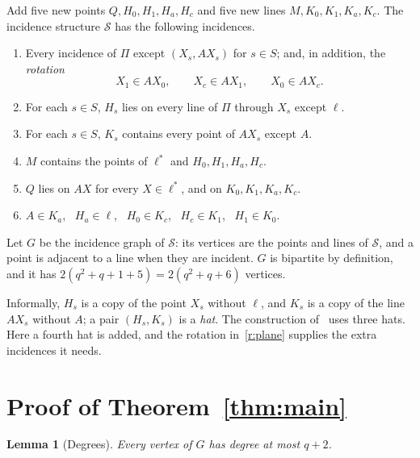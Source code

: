 \documentclass[11pt]{amsart}
\newtheorem{lemma}[theorem]{Lemma}
\theoremstyle{remark}
\newcommand{\cS}{\mathcal{S}}
\begin{document}
Add five new points $Q, H_0, H_1, H_a, H_c$ and five new lines $M, K_0, K_1, K_a, K_c$. The incidence structure $\cS$ has the following incidences.
\begin{enumerate}[label=\textup{(R\arabic*)},leftmargin=3em]
\item\label{r:plane} Every incidence of $\Pi$ except $(X_s, AX_s)$ for $s \in S$; and, in addition, the \emph{rotation}
\[ X_1 \in AX_0, \qquad X_c \in AX_1, \qquad X_0 \in AX_c. \]
\item\label{r:hat} For each $s \in S$, $H_s$ lies on every line of $\Pi$ through $X_s$ except $\ell$.
\item\label{r:hatline} For each $s \in S$, $K_s$ contains every point of $AX_s$ except $A$.
\item\label{r:M} $M$ contains the points of $\ell^*$ and $H_0, H_1, H_a, H_c$.
\item\label{r:Q} $Q$ lies on $AX$ for every $X \in \ell^*$, and on $K_0, K_1, K_a, K_c$.
\item\label{r:links} $A \in K_a$, \ $H_a \in \ell$, \ $H_0 \in K_c$, \ $H_c \in K_1$, \ $H_1 \in K_0$.
\end{enumerate}
Let $G$ be the incidence graph of $\cS$: its vertices are the points and lines of $\cS$, and a point is adjacent to a line when they are incident. $G$ is bipartite by definition, and it has $2(q^2+q+1+5) = 2(q^2+q+6)$ vertices.

Informally, $H_s$ is a copy of the point $X_s$ without $\ell$, and $K_s$ is a copy of the line $AX_s$ without $A$; a pair $(H_s, K_s)$ is a \emph{hat}. The construction of~\cite{AL} uses three hats. Here a fourth hat is added, and the rotation in~\ref{r:plane} supplies the extra incidences it needs.

\section{Proof of Theorem~\ref{thm:main}}

\begin{lemma}[Degrees]\label{lem:deg}
Every vertex of $G$ has degree at most $q+2$.
\end{lemma}
\end{document}
